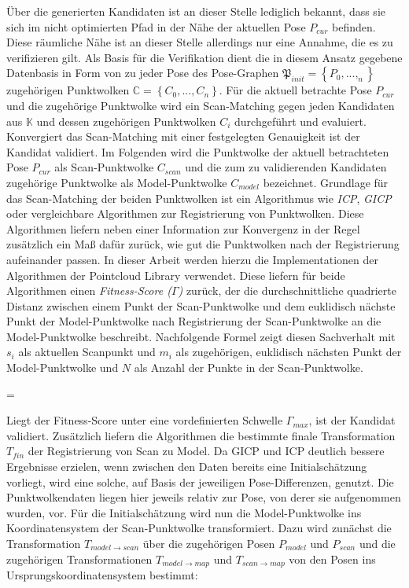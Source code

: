 Über die generierten Kandidaten ist an dieser Stelle lediglich bekannt, dass sie sich im nicht optimierten Pfad in der Nähe der aktuellen Pose $P_{cur}$ befinden. Diese räumliche Nähe ist an dieser Stelle allerdings nur eine Annahme, die es zu verifizieren gilt. Als Basis für die Verifikation dient die in diesem Ansatz gegebene Datenbasis in Form von zu jeder Pose des Pose-Graphen $\mathfrak{P}_{init} = \left\lbrace P_0, ..., _n \right\rbrace$ zugehörigen Punktwolken $ \mathbb{C} = \left\lbrace C_0, ..., C_n \right\rbrace$. Für die aktuell betrachte Pose $P_{cur}$ und die zugehörige Punktwolke wird ein Scan-Matching gegen jeden Kandidaten aus  $\mathbb{K}$ und dessen zugehörigen Punktwolken $C_i$ durchgeführt und evaluiert. Konvergiert das Scan-Matching mit einer festgelegten Genauigkeit ist der Kandidat validiert. Im Folgenden wird die Punktwolke der aktuell betrachteten Pose $P_{cur}$ als Scan-Punktwolke $C_{scan}$ und die zum zu validierenden Kandidaten zugehörige Punktwolke als Model-Punktwolke $C_{model}$ bezeichnet. Grundlage für das Scan-Matching der beiden Punktwolken ist ein Algorithmus wie \emph{ICP}, \emph{GICP} oder vergleichbare Algorithmen zur Registrierung von Punktwolken. Diese Algorithmen liefern neben einer Information zur Konvergenz in der Regel zusätzlich ein Maß dafür zurück, wie gut die Punktwolken nach der Registrierung aufeinander passen. In dieser Arbeit werden hierzu die Implementationen der Algorithmen der Pointcloud Library \cite{rusu20113d} verwendet. Diese liefern für beide Algorithmen einen \emph{Fitness-Score ($\Gamma$)} zurück, der die durchschnittliche quadrierte Distanz zwischen einem Punkt der Scan-Punktwolke und dem euklidisch nächste Punkt der Model-Punktwolke nach Registrierung der Scan-Punktwolke an die Model-Punktwolke beschreibt. Nachfolgende Formel zeigt diesen Sachverhalt mit $s_i$ als aktuellen Scanpunkt und $m_i$ als zugehörigen, euklidisch nächsten Punkt der Model-Punktwolke und $N$ als Anzahl der Punkte in der Scan-Punktwolke.

\begin{myequation}
\Gamma = 
\end{myequation}

Liegt der Fitness-Score unter eine vordefinierten Schwelle $\Gamma_{max}$, ist der Kandidat validiert.
Zusätzlich liefern die Algorithmen die bestimmte finale Transformation $T_{fin}$ der Registrierung von Scan zu Model. Da GICP und ICP deutlich bessere Ergebnisse erzielen, wenn zwischen den Daten bereits eine Initialschätzung vorliegt, wird eine solche, auf Basis der jeweiligen Pose-Differenzen, genutzt. Die Punktwolkendaten liegen hier jeweils relativ zur Pose, von derer sie aufgenommen wurden, vor. Für die Initialschätzung wird nun die Model-Punktwolke ins Koordinatensystem der Scan-Punktwolke transformiert. Dazu wird zunächst die Transformation $T_{model \rightarrow scan}$ über die zugehörigen Posen $P_{model}$ und $P_{scan}$ und die zugehörigen Transformationen $T_{model \rightarrow map}$ und $T_{scan \rightarrow map}$ von den Posen ins Ursprungskoordinatensystem bestimmt:

